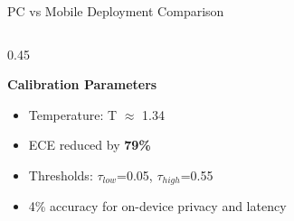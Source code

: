 \documentclass[aspectratio=169,12pt]{beamer}
\newcommand{\highlight}[1]{\textcolor{primaryblue}{\textbf{#1}}}
\begin{document}
\begin{frame}{PC vs Mobile Deployment Comparison}
\begin{columns}[T]
\begin{column}{0.45\textwidth}
\begin{center}
\end{center}

\vspace{0.3em}
\textbf{Calibration Parameters}
\begin{itemize}
\setlength\itemsep{0.1em}
    \item Temperature: T $\approx$ 1.34
    \item ECE reduced by \highlight{79\%}
    \item Thresholds: $\tau_{low}$=0.05, $\tau_{high}$=0.55
    \item 4\% accuracy for on-device privacy and latency
\end{itemize}
\end{column}
\end{columns}
\end{frame}
\end{document}
